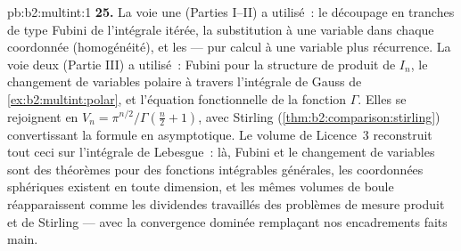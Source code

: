 \begin{solution}{pb:b2:multint:1}
\textbf{25.} La voie une (Parties I--II) a utilisé~: le découpage en
tranches de type Fubini de l'intégrale itérée, la substitution à une
variable dans chaque coordonnée (homogénéité), et les 
--- pur calcul à une variable plus récurrence. La voie deux
(Partie III) a utilisé~: Fubini pour la structure de produit de $I_n$,
le changement de variables polaire à travers l'intégrale de Gauss de
\cref{ex:b2:multint:polar}, et l'équation fonctionnelle de la fonction
$\Gamma$. Elles se rejoignent en $V_n =
\pi^{n/2}/\Gamma(\frac n2 + 1)$, avec Stirling
(\cref{thm:b2:comparison:stirling}) convertissant la formule
en asymptotique. Le volume de Licence~3 reconstruit tout ceci sur
l'intégrale de Lebesgue~: là, Fubini et le changement de variables
sont des théorèmes pour des fonctions intégrables générales, les
coordonnées sphériques existent en toute dimension, et les mêmes volumes
de boule réapparaissent comme les dividendes travaillés des
problèmes de mesure produit et de Stirling --- avec la convergence
dominée remplaçant nos encadrements faits main.
\end{solution}
